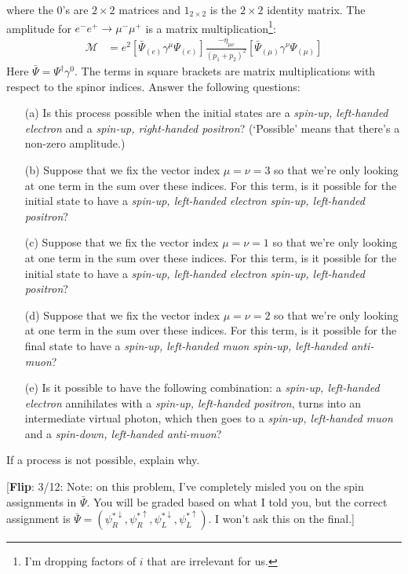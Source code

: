 \documentclass[12pt]{article}
\newcommand{\flip}[1]{{\color{red} [\textbf{Flip}: {#1}]}}
\begin{document}
where the $0$'s are $2\times 2$ matrices and $1_{2\times 2}$ is the $2\times 2$ identity matrix. The amplitude for $e^-e^+ \to \mu^-\mu^+$ is a matrix multiplication\footnote{I'm dropping factors of $i$ that are irrelevant for us.}:
\begin{align}
	\mathcal M &=
	e^2\left[ \bar\Psi_{(e)}\gamma^\mu \Psi_{(e)} \right]
	\frac{-\eta_{\mu\nu}}{(p_1+p_2)^2}
	\left[ \bar\Psi_{(\mu)}\gamma^\nu \Psi_{(\mu)} \right]
\end{align}
Here $\bar\Psi = \Psi^\dag \gamma^0$.  The terms in square brackets are matrix multiplications with respect to the spinor indices. Answer the following questions:
\begin{enumerate}
	\item[(a)] Is this process possible when the initial states are a \emph{spin-up, left-handed electron} and a \emph{spin-up, right-handed positron}? (`Possible' means that there's a non-zero amplitude.)
	\item[(b)] Suppose that we fix the vector index $\mu = \nu = 3$ so that we're only looking at one term in the sum over these indices. For this term, is it possible for the initial state to have a \emph{spin-up, left-handed electron}  \emph{spin-up, left-handed positron}?
	\item[(c)] Suppose that we fix the vector index $\mu = \nu = 1$ so that we're only looking at one term in the sum over these indices. For this term, is it possible for the initial state to have a \emph{spin-up, left-handed electron}  \emph{spin-up, left-handed positron}?
	\item[(d)] Suppose that we fix the vector index $\mu = \nu = 2$ so that we're only looking at one term in the sum over these indices. For this term, is it possible for the final state to have a \emph{spin-up, left-handed muon}  \emph{spin-up, left-handed anti-muon}?
	\item[(e)] Is it possible to have the following combination: a \emph{spin-up, left-handed electron} annihilates with a \emph{spin-up, left-handed positron}, turns into an intermediate virtual photon, which then goes to a \emph{spin-up, left-handed muon} and a \emph{spin-down, left-handed anti-muon}? 
\end{enumerate}
If a process is not possible, explain why.

\flip{3/12: Note: on this problem, I've completely misled you on the spin assignments in $\bar\Psi$. You will be graded based on what I told you, but the correct assignment is $\bar\Psi = (\psi_R^{*\downarrow}, \psi_R^{*\uparrow}, \psi_L^{*\downarrow}, \psi_L^{*\uparrow})$. I won't ask this on the final.}
\end{document}

